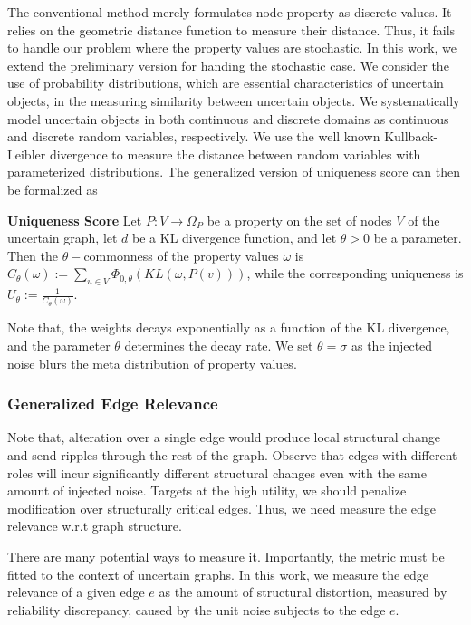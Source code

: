 The conventional method merely formulates  node property as discrete values.
It relies on the geometric distance function to measure their distance.  
Thus, it fails to handle our problem where the property values are stochastic.   
In this work, we extend the preliminary version for handing the stochastic case. 
We consider the use of probability distributions, which are essential characteristics of uncertain objects, in the measuring similarity between uncertain objects. 
We systematically model uncertain objects in both continuous and discrete domains as continuous and discrete random variables, respectively.
We use the well known Kullback-Leibler divergence to measure the distance between random variables with parameterized distributions. 
The generalized version of uniqueness score can then be formalized as
\begin{definition}
    \textbf{Uniqueness Score}
     Let $P:V \rightarrow  \Omega_{P}$ be a property on the set of nodes $V$ of the uncertain graph, 
     let $d$ be a KL divergence function, and let $\theta >0$  be a parameter. 
  	 Then the $\theta-$commonness of the property values $\omega$
  	 is $C_{\theta}(\omega):= \sum_{u \in V} \Phi_{0,\theta}(KL(\omega, P(v)))$,   
	 while the corresponding uniqueness is $U_{\theta}:= \frac{1}{C_{\theta}(\omega)}$. 
	 \vspace{-2pt}
\end{definition} 
Note that, the weights decays exponentially as a function of the KL divergence, 
and the parameter $\theta$ determines the decay rate. 
We set $\theta=\sigma$ as the injected noise blurs the meta distribution of property values. 
 
\subsubsection{Generalized Edge Relevance}

Note that, alteration over a single edge would produce local structural change and send ripples through the rest of the graph. 
Observe that edges with different roles will incur significantly different structural changes even with the same amount of injected noise. 
Targets at the high utility, we should penalize modification over structurally critical edges.  Thus, we need measure the edge relevance w.r.t graph structure. 

There are many potential ways to measure it. 
Importantly, the metric must be fitted to the context of uncertain graphs.
In this work, we measure the edge relevance of a given edge $e$
as the amount of structural distortion, measured by reliability discrepancy, caused by the unit noise subjects to the edge $e$. 

